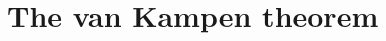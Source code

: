 \documentclass[hott-all.tex]{subfiles}
\begin{document}
\section{The van Kampen theorem}
% 
% 
% 
% 
% 
% 
\end{document}
